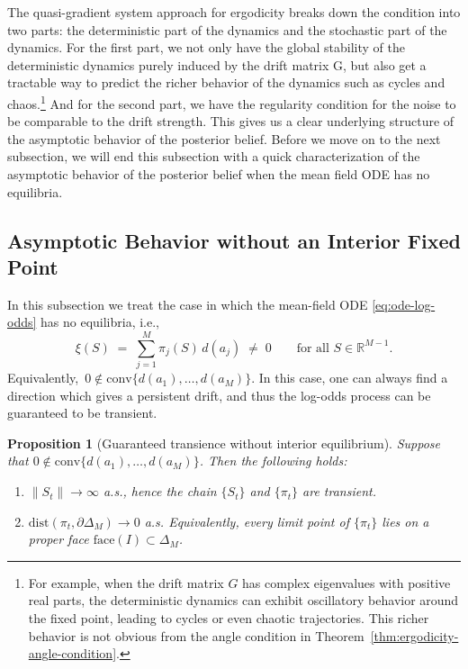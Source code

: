 \documentclass[12pt]{article}
\newtheorem{proposition}{Proposition}
\newcommand{\R}{\mathbb{R}}
\begin{document}
\vspace{0.5em}

The quasi-gradient system approach for ergodicity breaks down the condition into two
parts: the deterministic part of the dynamics and the stochastic part of the dynamics. For
the first part, we not only have the global stability of the deterministic dynamics purely
induced by the drift matrix G, but also get a tractable way to predict the richer behavior
of the dynamics such as cycles and chaos.\footnote{For example, when the drift matrix $G$ has complex eigenvalues with positive real parts, the deterministic dynamics can exhibit oscillatory behavior around the fixed point, leading to cycles or even chaotic trajectories. This richer behavior is not obvious from the angle condition in Theorem~\ref{thm:ergodicity-angle-condition}.} And for the second part, we have the regularity
condition for the noise to be comparable to the drift strength. This gives us a clear underlying
structure of the asymptotic behavior of the posterior belief. Before we move on to the
next subsection, we will end this subsection with a quick characterization of the asymptotic
behavior of the posterior belief when the mean field ODE has no equilibria.


\subsection{Asymptotic Behavior without an Interior Fixed Point}

In this subsection we treat the case in which the mean-field ODE \eqref{eq:ode-log-odds} has no equilibria, i.e.,
\[
\xi(S)\;=\;\sum_{j=1}^M \pi_j(S)\,d(a_j)\;\neq\;0\qquad\text{for all }S\in\R^{M-1}.
\]
Equivalently, $\,0\notin \mathrm{conv}\{d(a_1),\ldots,d(a_M)\}$. In this case, one can always find a direction which gives a persistent drift, and thus the log-odds process can be guaranteed to be transient.

\begin{proposition}[Guaranteed transience without interior equilibrium]\label{prop:transience-no-equilibrium}
Suppose that \(0\notin \mathrm{conv}\{d(a_1),\ldots,d(a_M)\}\).
Then the following holds:
\begin{enumerate}
\item $\|S_t\|\to\infty$ a.s., hence the chain $\{S_t\}$ and $\{\pi_t\}$ are transient.
\item $\mathrm{dist}(\pi_t,\partial\Delta_M)\to 0$ a.s.
Equivalently, every limit point of $\{\pi_t\}$ lies on a proper face $\mathrm{face}(I)\subset\Delta_M$.
\end{enumerate}
\end{proposition}
\end{document}
